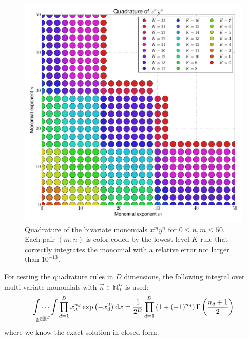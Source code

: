 \documentclass[a4paper,10pt]{article}
\begin{document}
\begin{figure}[h]
  \centering
  \includegraphics[width=\linewidth]{./img/monomial_errors_hermitephy_2D.pdf}
  \caption{Quadrature of the bivariate monomials $x^m y^n$ for $0 \leq n, m \leq 50$.
  Each pair $(m,n)$ is color-coded by the lowest level $K$ rule that correctly
  integrates the monomial with a relative error not larger than $10^{-13}$.}
  \label{fig:monomial_errors_hermitephy_2D}
\end{figure}

For testing the quadrature rules in $D$ dimensions, the following integral
over multi-variate monomials with $\vec{n} \in \mathbb{N}_0^D$ is used:
\begin{equation} \label{eq:hermitephy_exact_solution}
  \idotsint \limits_{\underline{x} \in \mathbb{R}^D} \prod_{d=1}^D x_d^{n_d} \exp\left(-x_d^2\right) \mathrm{d}\underline{x}
  =
  \frac{1}{2^D} \prod_{d=1}^D \left(1 + (-1)^{n_d}\right) \Gamma\left(\frac{n_d + 1}{2}\right)
\end{equation}
where we know the exact solution in closed form.
\end{document}
